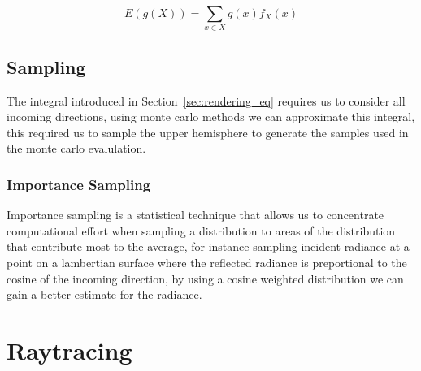 \begin{equation}
E\left(g\left(X\right)\right) = \sum\limits_{x \in X} g\left(x\right)f_X\left(x\right)
\end{equation}

\subsection{Sampling}
The integral introduced in Section~\ref{sec:rendering_eq} requires us to consider all incoming directions, using monte carlo
methods we can approximate this integral, this required us to sample the upper hemisphere to generate the samples used
in the monte carlo evalulation.

\subsubsection{Importance Sampling}
Importance sampling is a statistical technique that allows us to concentrate computational effort when sampling a distribution
to areas of the distribution that contribute most to the average, for instance sampling incident radiance at a point on a lambertian
surface where the reflected radiance is preportional to the cosine of the incoming direction, by using a cosine weighted distribution
we can gain a better estimate for the radiance.


\section{Raytracing}
